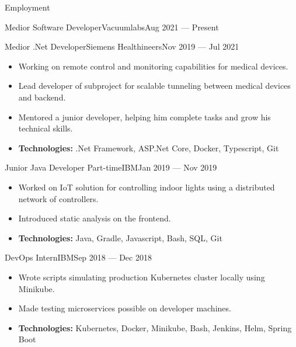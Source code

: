 \documentclass[]{style}
\begin{document}
	\makeheader

	\begin{cvsection}{Employment}
	
    	\begin{cvsubsection}{Medior Software Developer}{Vacuumlabs}{Aug 2021 — Present}
			
		\end{cvsubsection}
		
    	\begin{cvsubsection}{Medior .Net Developer}{Siemens Healthineers}{Nov 2019 — Jul 2021}
			\begin{itemize}
			    \item Working on remote control and monitoring capabilities for medical devices.
			    \item Lead developer of subproject for scalable tunneling between medical devices and backend.
			    \item Mentored a junior developer, helping him complete tasks and grow his technical skills.
			    \item \textbf{Technologies:} .Net Framework, ASP.Net Core, Docker, Typescript, Git
			\end{itemize}
		\end{cvsubsection}
		
    	\begin{cvsubsection}{Junior Java Developer Part-time}{IBM}{Jan 2019 — Nov 2019}
			\begin{itemize}
    			\item Worked on IoT solution for controlling indoor lights using a distributed network of controllers.
    			\item Introduced static analysis on the frontend.
    			\item \textbf{Technologies:} Java, Gradle, Javascript, Bash, SQL, Git
			\end{itemize}
		\end{cvsubsection}
		
    	\begin{cvsubsection}{DevOps Intern}{IBM}{Sep 2018 — Dec 2018}
			\begin{itemize}
			    \item Wrote scripts simulating production Kubernetes cluster locally using Minikube.
			    \item Made testing microservices possible on developer machines.
			    \item \textbf{Technologies:} Kubernetes, Docker, Minikube, Bash, Jenkins, Helm, Spring Boot
			\end{itemize}
		\end{cvsubsection}
		

\end{cvsection}
\end{document}
